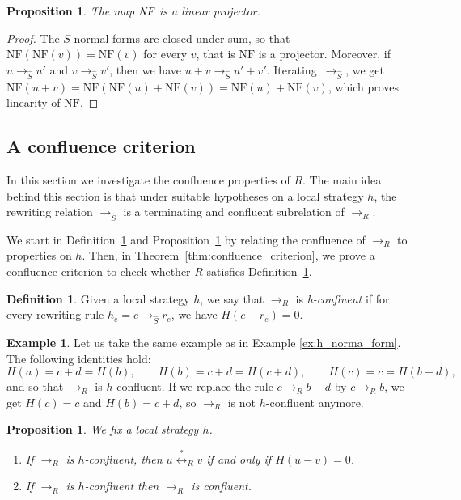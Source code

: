 \documentclass[10pt]{easychair}
\newtheorem{proposition}[theorem]{Proposition}
\theoremstyle{definition}
\newtheorem{definition}[theorem]{Definition}
\newtheorem{example}[theorem]{Example}
\newcommand\rewR{\to_R}
\newcommand\rewS{\to_{\hat{S}}}
\newcommand\equivR{\overset{*}{\leftrightarrow}_R}
\newcommand\NF{\text{NF}}
\newcommand\NFF{\emph{NF}}
\begin{document}
\begin{proposition}\label{prop:linearity_of_H}
  The map $\NFF$ is a linear projector.
\end{proposition}

\begin{proof}
  The $S$-normal forms are closed under sum, so that $\NF(\NF(v))=\NF(v)$
  for every $v$, that is $\NF$ is a projector. Moreover, if $u\rewS u'$
  and $v\rewS v'$, then we have $u+v\rewS u'+v'$. Iterating~$\rewS$, we
  get $\NF(u+v)=\NF(\NF(u)+\NF(v))=\NF(u)+\NF(v)$, which proves linearity
  of $\NF$.
\end{proof}

\subsection{A confluence criterion}
\label{sec:a_confluence_criterion}

In this section we investigate the confluence properties of $R$. The main
idea behind this section is that under suitable hypotheses on a local
strategy $h$, the rewriting relation $\rewS$ is a terminating and
confluent subrelation of $\rewR$.
\medskip

We start in Definition~\ref{def:standardisation_property} and 
Proposition~\ref{prop:h_and_R_confluence} by relating the confluence of
$\rewR$ to properties on $h$. Then, in
Theorem~\ref{thm:confluence_criterion}, we prove a confluence criterion
to check whether $R$ satisfies
Definition~\ref{def:standardisation_property}.

\begin{definition}\label{def:standardisation_property}
  Given a local strategy $h$, we say that $\rewR$ is \emph{h-confluent}
  if for every rewriting rule $h_e=e\rewS r_e$, we have $H(e-r_e)=0$.
\end{definition}
\smallskip

\begin{example}
  Let us take the same example as in Example \ref{ex:h_norma_form}. The
  following identities hold:
  \[
  H(a)=c+d=H(b),\qquad H(b)=c+d=H(c+d),\qquad H(c)=c= H(b-d),
  \]
  and so that $\rewR$ is $h$-confluent. If we replace the rule
  $c\rewR b-d$ by $c\rewR b$, we get $H(c)=c$ and $H(b)=c+d$, so $\rewR$
  is not $h$-confluent anymore. 
\end{example}
\smallskip

\begin{proposition}\label{prop:h_and_R_confluence}
  We fix a  local strategy $h$.
  \begin{enumerate}
  \item\label{it:equationnal_theory} If $\rewR$ is $h$-confluent, then
    $u\equivR v$ if and only if $H(u-v)=0$.
  \item\label{it:h-conf_implies_conf} If $\rewR$ is $h$-confluent then
    $\rewR$ is confluent.
  \end{enumerate}
\end{proposition}
\end{document}
